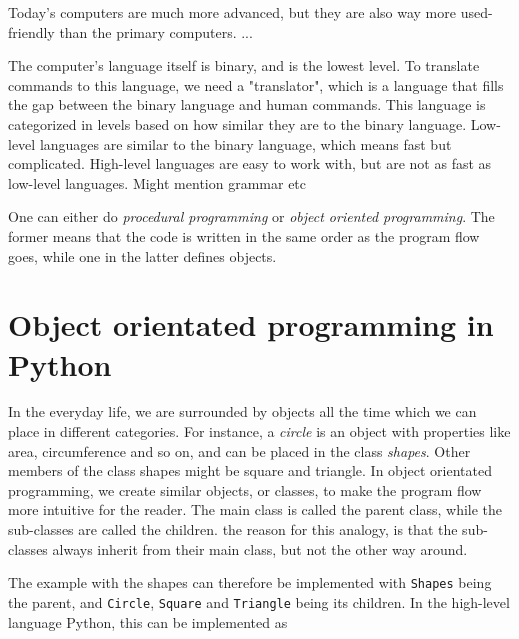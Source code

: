 Today's computers are much more advanced, but they are also way more used-friendly than the primary computers. ...


The computer's language itself is binary, and is the lowest level. To translate commands to this language, we need a "translator", which is a language that fills the gap between the binary language and human commands. This language is categorized in levels based on how similar they are to the binary language. Low-level languages are similar to the binary language, which means fast but complicated. High-level languages are easy to work with, but are not as fast as low-level languages. Might mention grammar etc

One can either do \textit{procedural programming} or \textit{object oriented programming}. The former means that the code is written in the same order as the program flow goes, while one in the latter defines objects. 

\section{Object orientated programming in Python}
In the everyday life, we are surrounded by objects all the time which we can place in different categories. For instance, a \textit{circle} is an object with properties like area, circumference and so on, and can be placed in the class \textit{shapes}. Other members of the class shapes might be square and triangle. In object orientated programming, we create similar objects, or classes, to make the program flow more intuitive for the reader. The main class is called the parent class, while the sub-classes are called the children. the reason for this analogy, is that the sub-classes always inherit from their main class, but not the other way around. 

The example with the shapes can therefore be implemented with \texttt{Shapes} being the parent, and \texttt{Circle}, \texttt{Square} and \texttt{Triangle} being its children. In the high-level language Python, this can be implemented as 

